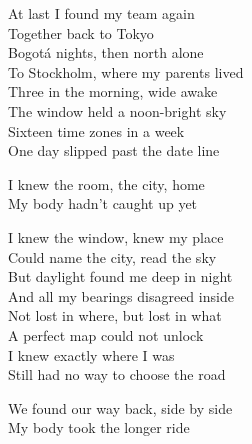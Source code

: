 \begin{lyrics}
At last I found my team again\\
Together back to Tokyo\\
Bogotá nights, then north alone\\
To Stockholm, where my parents lived\\
Three in the morning, wide awake\\
The window held a noon-bright sky\\
Sixteen time zones in a week\\
One day slipped past the date line

I knew the room, the city, home\\
My body hadn't caught up yet


I knew the window, knew my place\\
Could name the city, read the sky\\
But daylight found me deep in night\\
And all my bearings disagreed inside\\
Not lost in where, but lost in what\\
A perfect map could not unlock\\
I knew exactly where I was\\
Still had no way to choose the road

We found our way back, side by side\\
My body took the longer ride
\end{lyrics}

